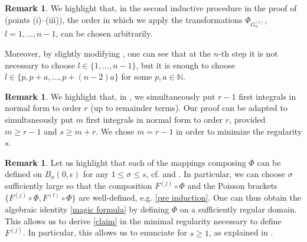 \documentclass[a4paper,10pt,reqno]{article}
\theoremstyle{definition}
\theoremstyle{plain}
\theoremstyle{plain}
\theoremstyle{definition}
\theoremstyle{plain}
\theoremstyle{plain}
\theoremstyle{plain}
\theoremstyle{definition}
\newtheorem{rem}[definition]{Remark}
\theoremstyle{definition}
\def \N{\mathbb N}
\def \k{\bm{k}}
\begin{document}


\begin{rem}
We highlight that, in the second inductive procedure in the proof of  (points (i)--(iii)), the order in which we apply the transformations $\Phi_{G_n^{(l)}}$, $l=1,\ldots,n-1$, can be chosen arbitrarily.

\smallskip

Moreover, by slightly modifying , one can see that at the $n$-th step it is not necessary to choose $l \in \{ 1,\ldots,n-1 \}$, but it is enough to choose $l \in \{ p, p + a, \ldots, p + (n-2) a \}$ for some $p,a \in \N.$
\end{rem}

\begin{rem} We highlight that, in , we simultaneously put $r-1$ first integrals in normal form to order $r$ (up to remainder terms). Our proof can be adapted to simultaneously put $m$ first integrals in normal form to order $r$, provided $m\geq r-1$ and $s\geq m+r$. We chose $m=r-1$ in order to minimize the regularity $s$.
\end{rem}

\begin{rem}\label{rk: low regularity}
    Let us highlight that each of the mappings composing $\Phi$ can be defined on $B_{\sigma}(0,\epsilon)$  for any $1\leq \sigma\leq s$, cf.  and . In particular, we can choose $\sigma$ sufficiently large so that the composition $F^{(j)}\circ\Phi$ and the Poisson brackets $\{ F^{(j)}\circ\Phi, F^{(l)}\circ\Phi\}$ are well-defined, e.g. \eqref{pre induction}. One can thus obtain the algebraic identity \eqref{magic formula}
    by defining $\Phi$ on a sufficiently regular domain. This allows us to derive \eqref{claim}
    in the minimal regularity necessary to define $F^{(j)}$. In particular, this allows us to enunciate  for $s\geq 1$, as explained in .
\end{rem}
\end{document}
